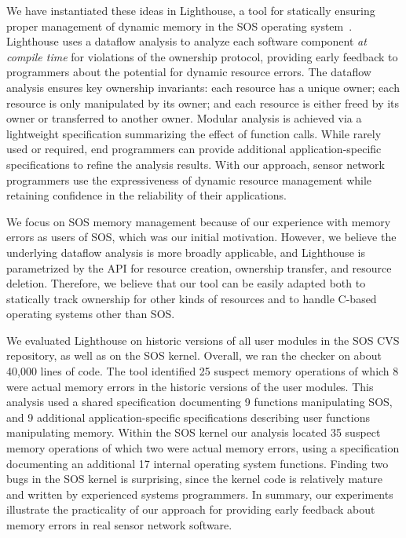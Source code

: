 We have instantiated these ideas in Lighthouse, a tool for statically
ensuring proper management of dynamic memory in the SOS operating
system~\cite{sos}.  
%
Lighthouse uses a dataflow analysis to analyze each software component {\em
at compile time} for violations of the ownership protocol, providing early
feedback to programmers about the potential for dynamic resource errors.  
%
The dataflow analysis ensures key ownership invariants:  each resource has a
unique owner; each resource is only manipulated by its owner; and each
resource is either freed by its owner or transferred to another owner.  
%
Modular analysis is achieved via a lightweight specification summarizing the
effect of function calls.
%
While rarely used or required, end programmers can provide additional
application-specific specifications to refine the analysis results.
%
With our approach, sensor network programmers use the expressiveness of
dynamic resource management while retaining confidence in the reliability of
their applications.



We focus on SOS memory management because of our experience with memory
errors as users of SOS, which was our initial motivation.  
%
However, we believe the underlying dataflow analysis is more broadly
applicable, and Lighthouse is parametrized by the API for resource creation,
ownership transfer, and resource deletion.  
%
Therefore, we believe that our tool can be easily adapted both to statically
track ownership for other kinds of resources and to handle C-based operating
systems other than SOS.



We evaluated Lighthouse on historic versions of all user modules in the SOS
CVS repository, as well as on the SOS kernel.  
%
Overall, we ran the checker on about 40,000 lines of code.  
%
The tool identified 25 suspect memory operations of which 8 were actual
memory errors in the historic versions of the user modules.
%
This analysis used a shared specification documenting 9 functions
manipulating SOS, and 9 additional application-specific specifications
describing user functions manipulating memory.
%
Within the SOS kernel our analysis located 35 suspect memory operations of
which two were actual memory errors, using a specification documenting an
additional 17 internal operating system functions.  
%
Finding two bugs in the SOS kernel is surprising, since the kernel code is
relatively mature and written by experienced systems programmers.  
%
In summary, our experiments illustrate the practicality of our approach for
providing early feedback about memory errors in real sensor network
software.



